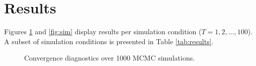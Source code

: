 \documentclass[article]{jss}
\begin{document}

\section{Results}


Figures \ref{fig:conv} and \ref{fig:sim} display results per simulation condition ($T = 1,2,\dots,100$). A subset of simulation conditions is presented in Table \ref{tab:results}. 

\begin{figure}[h]
  \caption{Convergence diagnostics over 1000 MCMC simulations.}
    \label{fig:conv}
\end{figure}

\end{document}
